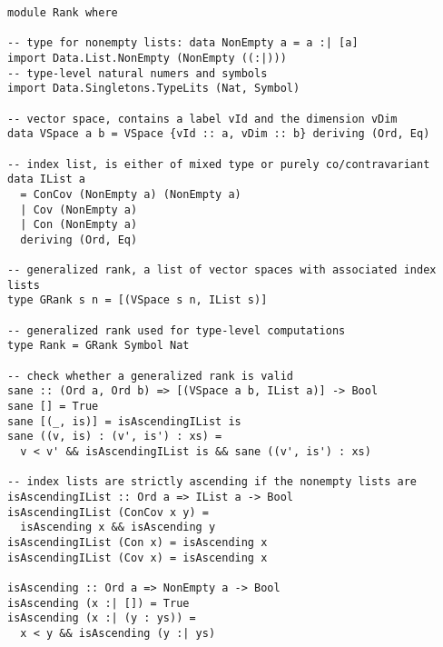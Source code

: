 \begin{code}
  \label{code_haskell_rank_type}
  \begin{verbatim}
module Rank where

-- type for nonempty lists: data NonEmpty a = a :| [a]
import Data.List.NonEmpty (NonEmpty ((:|)))
-- type-level natural numers and symbols
import Data.Singletons.TypeLits (Nat, Symbol)

-- vector space, contains a label vId and the dimension vDim
data VSpace a b = VSpace {vId :: a, vDim :: b} deriving (Ord, Eq)

-- index list, is either of mixed type or purely co/contravariant
data IList a
  = ConCov (NonEmpty a) (NonEmpty a)
  | Cov (NonEmpty a)
  | Con (NonEmpty a)
  deriving (Ord, Eq)

-- generalized rank, a list of vector spaces with associated index lists
type GRank s n = [(VSpace s n, IList s)]

-- generalized rank used for type-level computations
type Rank = GRank Symbol Nat

-- check whether a generalized rank is valid
sane :: (Ord a, Ord b) => [(VSpace a b, IList a)] -> Bool
sane [] = True
sane [(_, is)] = isAscendingIList is
sane ((v, is) : (v', is') : xs) =
  v < v' && isAscendingIList is && sane ((v', is') : xs)

-- index lists are strictly ascending if the nonempty lists are
isAscendingIList :: Ord a => IList a -> Bool
isAscendingIList (ConCov x y) =
  isAscending x && isAscending y
isAscendingIList (Con x) = isAscending x
isAscendingIList (Cov x) = isAscending x

isAscending :: Ord a => NonEmpty a -> Bool
isAscending (x :| []) = True
isAscending (x :| (y : ys)) =
  x < y && isAscending (y :| ys)
  \end{verbatim}
\end{code}

